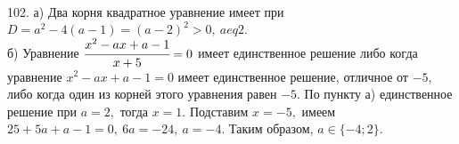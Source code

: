 102. а) Два корня квадратное уравнение имеет при $D=a^2-4(a-1)=(a-2)^2>0,\ a
eq2.$\\
б) Уравнение $\cfrac{x^2-ax+a-1}{x+5}=0$ имеет единственное решение либо когда уравнение $x^2-ax+a-1=0$ имеет единственное решение, отличное от $-5,$ либо когда один из корней этого уравнения равен $-5.$ По пункту а) единственное решение при $a=2,$ тогда $x=1.$ Подставим $x=-5,$ имеем $25+5a+a-1=0,\ 6a=-24,\ a=-4.$ Таким образом, $a\in\{-4;2\}.$\\
